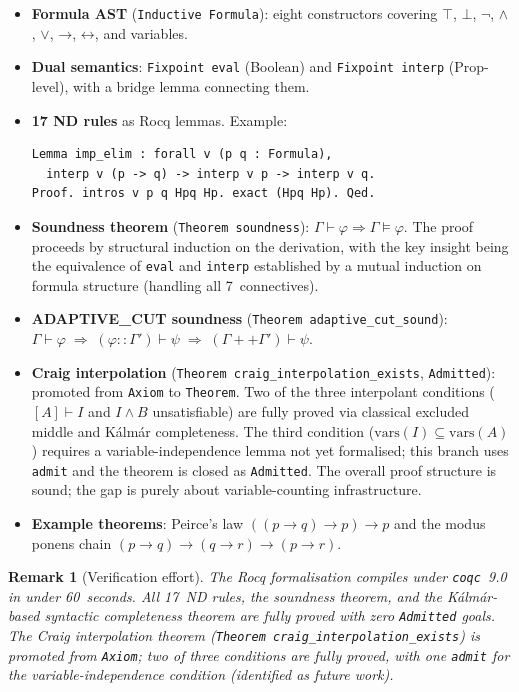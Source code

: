 \documentclass[acmtocl,review,anonymous]{acmart}
\newtheorem{remark}{Remark}
\newcommand{\entails}{\vDash}
\newcommand{\proves}{\vdash}
\newcommand{\dland}{\mathbin{\wedge}}
\newcommand{\dlor}{\mathbin{\vee}}
\newcommand{\dlnot}{\neg}
\newcommand{\dlimp}{\mathbin{\to}}
\newcommand{\dliff}{\mathbin{\leftrightarrow}}
\newcommand{\dlbot}{\bot}
\newcommand{\dltop}{\top}
\begin{document}
\begin{itemize}
  \item \textbf{Formula AST} (\texttt{Inductive Formula}): eight
    constructors covering $\dltop$, $\dlbot$, $\dlnot$, $\dland$,
    $\dlor$, $\dlimp$, $\dliff$, and variables.
  \item \textbf{Dual semantics}:
    \texttt{Fixpoint eval} (Boolean) and \texttt{Fixpoint interp}
    (Prop-level), with a bridge lemma connecting them.
  \item \textbf{17 ND rules} as Rocq lemmas.  Example:
    \begin{lstlisting}[gobble=4]
Lemma imp_elim : forall v (p q : Formula),
  interp v (p -> q) -> interp v p -> interp v q.
Proof. intros v p q Hpq Hp. exact (Hpq Hp). Qed.
    \end{lstlisting}
  \item \textbf{Soundness theorem}
    (\texttt{Theorem soundness}):
    $\Gamma \proves \varphi \Rightarrow \Gamma \entails \varphi$.
    The proof proceeds by structural induction on the derivation,
    with the key insight being the equivalence of \texttt{eval} and
    \texttt{interp} established by a mutual induction on formula
    structure (handling all 7~connectives).
  \item \textbf{ADAPTIVE\_CUT soundness}
    (\texttt{Theorem adaptive\_cut\_sound}):
    $\Gamma \proves \varphi \;\Rightarrow\;
    (\varphi :: \Gamma') \proves \psi
    \;\Rightarrow\;
    (\Gamma ++ \Gamma') \proves \psi$.
  \item \textbf{Craig interpolation}
    (\texttt{Theorem craig\_interpolation\_exists}, \texttt{Admitted}):
    promoted from \texttt{Axiom} to \texttt{Theorem}.  Two of the three
    interpolant conditions (\([A] \vdash I\) and \(I \wedge B\) unsatisfiable)
    are fully proved via classical excluded middle and Kálmár completeness.
    The third condition (\(\mathrm{vars}(I) \subseteq \mathrm{vars}(A)\))
    requires a variable-independence lemma not yet formalised; this
    branch uses \texttt{admit} and the theorem is closed as
    \texttt{Admitted}.  The overall proof structure is sound; the gap
    is purely about variable-counting infrastructure.
  \item \textbf{Example theorems}: Peirce's law
    $((p \to q) \to p) \to p$ and the modus ponens chain
    $(p \to q) \to (q \to r) \to (p \to r)$.
\end{itemize}

\begin{remark}[Verification effort]
  The Rocq formalisation compiles under \texttt{coqc}~9.0 in under
  60~seconds.  All 17~ND rules, the soundness theorem, and the
  Kálmár-based syntactic completeness theorem are fully proved with
  zero \texttt{Admitted} goals.  The Craig interpolation theorem
  (\texttt{Theorem craig\_interpolation\_exists}) is promoted from
  \texttt{Axiom}; two of three conditions are fully proved, with
  one \texttt{admit} for the variable-independence condition
  (identified as future work).
\end{remark}
\end{document}
